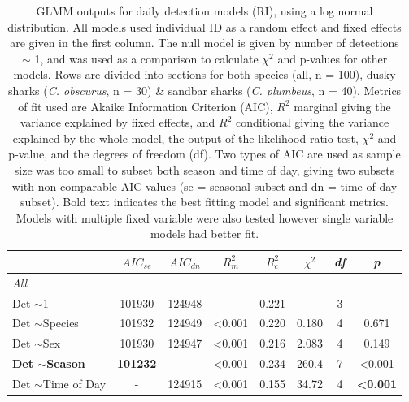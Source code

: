 \documentclass[11pt,a4paper]{article}
\begin{document}
	\newpage
	
	\begin{table}[h!]
		\caption{GLMM outputs for daily detection models (RI), using a log normal distribution. All models used individual ID as a random effect and fixed effects are given in the first column. The null model is given by number of detections $\sim$ 1, and was used as a comparison to calculate $\chi^2$ and p-values for other models. Rows are divided into sections for both species (all, n = 100), dusky sharks (\textit{C. obscurus}, n = 30) \& sandbar sharks (\textit{C. plumbeus}, n = 40). Metrics of fit used are Akaike Information Criterion (AIC), $R^2$ marginal giving the variance explained by fixed effects, and $R^2$ conditional giving the variance explained by the whole model, the output of the likelihood ratio test, $\chi^2$ and p-value, and the degrees of freedom (df). Two types of AIC are used as sample size was too small to subset both season and time of day, giving two subsets with non comparable AIC values (se = seasonal subset and dn = time of day subset). Bold text indicates the best fitting model and significant metrics. Models with multiple fixed variable were also tested however single variable models had better fit.}
		\centering
		\begin{tabular}{lccccccc}
			& $AIC_{se}$ & $AIC_{dn}$ & $R^2_m$ & $R^2_c$ & $\chi^2$ & \textit{df} & \textit{p}      \\ \hline
			\textit{All}                   &             &             &                         &                         &                        &             &                 \\
			Det $\sim$1                    & 101930      & 124948      & -                       & 0.221                   & -                      & 3           & -               \\
			Det $\sim$Species              & 101932      & 124949      & \textless 0.001         & 0.220                   & 0.180                  & 4           & 0.671           \\
			Det $\sim$Sex                  & 101930      & 124947      & \textless 0.001         & 0.216                   & 2.083                  & 4           & 0.149           \\
			\textbf{Det $\sim$Season}               & \textbf{101232}      & -           & \textless 0.001         & 0.234                   & 260.4                  & 7           & \textless 0.001 \\
			Det $\sim$Time of Day          & -           & 124915      & \textless 0.001         & 0.155                   & 34.72                  & 4           & \textbf{\textless 0.001} \\

\end{tabular}
\end{table}
\end{document}
